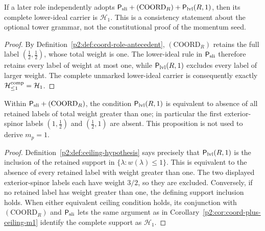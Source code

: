 \documentclass[11pt,a4paper]{article}
\begin{document}
\begin{corollary}
\label{p2:cor:coord-plus-ceiling-m1}
If a later role independently adopts
\(\mathsf P_{\rm sli}+(\mathrm{COORD}_R)+\mathsf P_{\rm lvl}(R,1)\), then its
complete lower-ideal carrier is \(\mathcal H_1\).  This is a consistency
statement about the optional tower grammar, not the constitutional proof of
the momentum seed.
\end{corollary}

\begin{proof}
By Definition~\ref{p2:def:coord-role-antecedent},
\((\mathrm{COORD}_R)\) retains the full label
\((\tfrac12,\tfrac12)\), whose total weight is one.  The lower-ideal rule in
\(\mathsf P_{\rm sli}\) therefore retains every label of weight at most one,
while \(\mathsf P_{\rm lvl}(R,1)\) excludes every label of larger weight.
The complete unmarked lower-ideal carrier is consequently exactly
\(\mathcal H_{\le1}^{\rm comp}=\mathcal H_1\).
\end{proof}

\begin{proposition}
\label{p2:prop:level-one-support-ceiling-bridge}
Within \(\mathsf P_{\rm sli}+(\mathrm{COORD}_R)\), the condition
\(\mathsf P_{\rm lvl}(R,1)\) is equivalent to absence of all retained labels
of total weight greater than one; in particular the first exterior-spinor
labels \((1,\tfrac12)\) and \((\tfrac12,1)\) are absent.  This proposition is
not used to derive \(m_p=1\).
\end{proposition}

\begin{proof}
Definition~\ref{p2:def:ceiling-hypothesis} says precisely that
\(\mathsf P_{\rm lvl}(R,1)\) is the inclusion of the retained support in
\(\{\lambda:w(\lambda)\le1\}\).  This is equivalent to the absence of every
retained label with weight greater than one.  The two displayed exterior-spinor
labels each have weight \(3/2\), so they are excluded.  Conversely, if no
retained label has weight greater than one, the defining support inclusion
holds.  When either equivalent ceiling condition holds, its conjunction with
\((\mathrm{COORD}_R)\) and \(\mathsf P_{\rm sli}\) lets the same argument as
in Corollary~\ref{p2:cor:coord-plus-ceiling-m1} identify the complete support
as \(\mathcal H_1\).
\end{proof}
\end{document}
